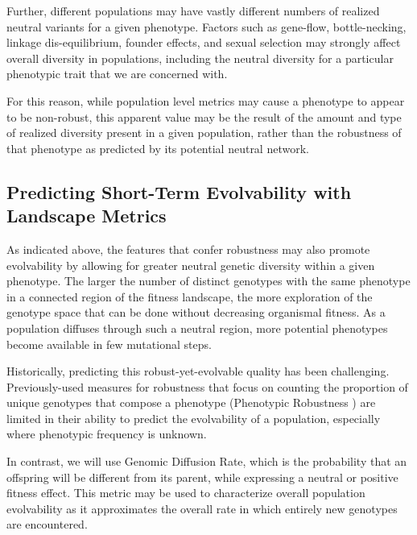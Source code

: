 \documentclass[PhD]{msu-thesis}
\begin{document}
Further, different populations may have vastly different numbers of realized neutral variants for a given phenotype. Factors such as gene-flow, bottle-necking, linkage dis-equilibrium, founder effects, and sexual selection may strongly affect overall diversity in populations, including the neutral diversity for a particular phenotypic trait that we are concerned with\cite{alberch_genes_1991}.

For this reason, while population level metrics may cause a phenotype to appear to be non-robust, this apparent value may be the result of the amount and type of realized diversity present in a given population, rather than the robustness of that phenotype as predicted by its potential neutral network\cite{alberch_genes_1991}. 

\subsection{Predicting Short-Term Evolvability with Landscape Metrics}

As indicated above, the features that confer robustness may also promote evolvability by allowing for greater neutral genetic diversity within a given phenotype. The larger the number of distinct genotypes with the same phenotype in a connected region of the fitness landscape, the more exploration of the genotype space that can be done without decreasing organismal fitness. As a population diffuses through such a neutral region, more potential phenotypes become available in few mutational steps\cite{andreas_wagner_robustness_2005}.

Historically, predicting this robust-yet-evolvable quality has been challenging. Previously-used measures for robustness that focus on counting the proportion of unique genotypes that compose a phenotype (Phenotypic Robustness \cite{andreas_wagner_robustness_2008}) are limited in their ability to predict the evolvability of a population, especially where phenotypic frequency is unknown. 

In contrast, we will use Genomic Diffusion Rate, which is the probability that an offspring will be different from its parent, while expressing a neutral or positive fitness effect. This metric may be used to characterize overall population evolvability as it approximates the overall rate in which entirely new genotypes are encountered\cite{ofria_evolution_2002}. 
\end{document}
